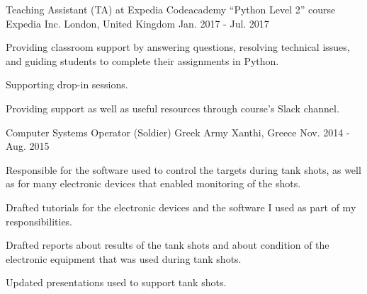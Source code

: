 

\begin{cventries}


  \cventry
    {Teaching Assistant (TA) at Expedia Codeacademy ``Python Level 2'' course} %
    {Expedia Inc.} %
    {London, United Kingdom} %
    {Jan. 2017 - Jul. 2017} %
    {
      \begin{cvitems} %
        \item {Providing classroom support by answering questions, resolving technical issues, and guiding students to complete their assignments in Python.}
        \item {Supporting drop-in sessions.}
        \item {Providing support as well as useful resources through course's Slack channel.}
      \end{cvitems}
    } 
  \cventry
    {Computer Systems Operator (Soldier)} %
    {Greek Army} %
    {Xanthi, Greece} %
    {Nov. 2014 - Aug. 2015} %
    {
      \begin{cvitems} %
      	\item {Responsible for the software used to control the targets during tank shots, as well as for many electronic devices that enabled monitoring of the shots.}
      	\item {Drafted tutorials for the electronic devices and the software I used as part of my responsibilities.}
      	\item {Drafted reports about results of the tank shots and about condition of the electronic equipment that was used during tank shots.}
        \item {Updated presentations used to support tank shots.}
      \end{cvitems}
    }
    

\end{cventries}
